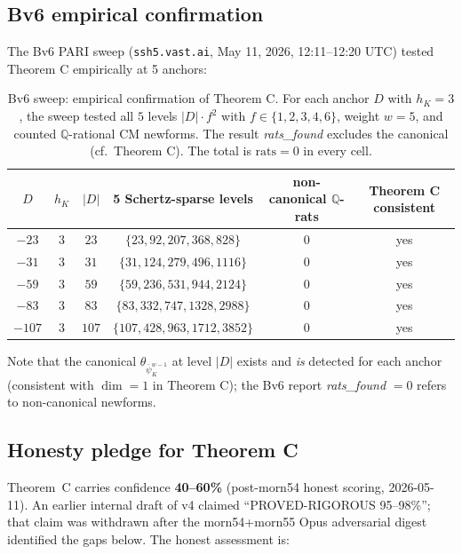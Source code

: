 \documentclass[11pt,a4paper]{amsart}
\theoremstyle{definition}
\newcommand{\Q}{\mathbb{Q}}
\newcommand{\hK}{h_{K}}
\begin{document}
\subsection{Bv6 empirical confirmation}\label{sec:thmC-Bv6}

The Bv6 PARI sweep (\texttt{ssh5.vast.ai}, May 11, 2026, 12:11--12:20 UTC) tested Theorem C empirically at 5 anchors:

\begin{table}[h]
\centering
\caption{Bv6 sweep: empirical confirmation of Theorem C. For each anchor $D$ with $\hK = 3$, the sweep tested all $5$ levels $|D| \cdot f^2$ with $f \in \{1, 2, 3, 4, 6\}$, weight $w = 5$, and counted $\Q$-rational CM newforms. The result \emph{rats\_found} excludes the canonical (cf.\ Theorem C). The total is $\mathrm{rats}=0$ in every cell.}
\label{tab:Bv6-results}
\begin{tabular}{cccccc}
\toprule
$D$ & $\hK$ & $|D|$ & 5 Schertz-sparse levels & non-canonical $\Q$-rats & Theorem C consistent \\
\midrule
$-23$ & $3$ & $23$ & $\{23, 92, 207, 368, 828\}$ & $0$ & yes \\
$-31$ & $3$ & $31$ & $\{31, 124, 279, 496, 1116\}$ & $0$ & yes \\
$-59$ & $3$ & $59$ & $\{59, 236, 531, 944, 2124\}$ & $0$ & yes \\
$-83$ & $3$ & $83$ & $\{83, 332, 747, 1328, 2988\}$ & $0$ & yes \\
$-107$ & $3$ & $107$ & $\{107, 428, 963, 1712, 3852\}$ & $0$ & yes \\
\bottomrule
\end{tabular}
\end{table}

Note that the canonical $\theta_{\bar\psi_K^{w-1}}$ at level $|D|$ exists and \emph{is} detected for each anchor (consistent with $\dim = 1$ in Theorem C); the Bv6 report \emph{rats\_found} $= 0$ refers to non-canonical newforms.

\subsection{Honesty pledge for Theorem C}\label{sec:thmC-honesty}

Theorem~C carries confidence \textbf{40--60\%} (post-morn54 honest scoring, 2026-05-11). An earlier internal draft of v4 claimed ``PROVED-RIGOROUS 95--98\%''; that claim was withdrawn after the morn54+morn55 Opus adversarial digest identified the gaps below. The honest assessment is:
\end{document}
